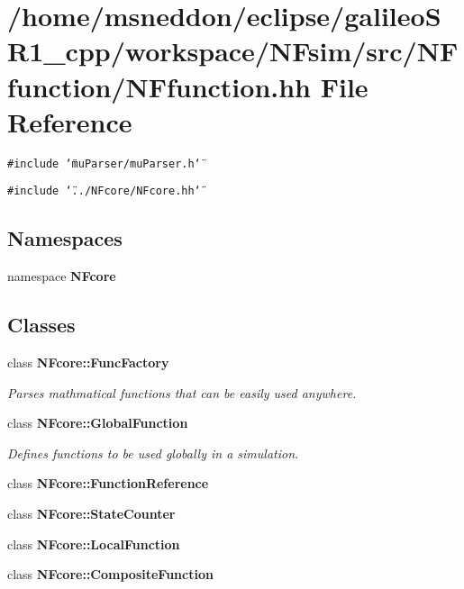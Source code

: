 \section{/home/msneddon/eclipse/galileoSR1\_\-cpp/workspace/NFsim/src/NFfunction/NFfunction.hh File Reference}
\label{NFfunction_8hh}


{\tt \#include \char`\"{}muParser/muParser.h\char`\"{}}\par
{\tt \#include \char`\"{}../NFcore/NFcore.hh\char`\"{}}\par
\subsection*{Namespaces}
\begin{CompactItemize}
\item 
namespace {\bf NFcore}
\end{CompactItemize}
\subsection*{Classes}
\begin{CompactItemize}
\item 
class {\bf NFcore::FuncFactory}
\begin{CompactList}\small\item\em Parses mathmatical functions that can be easily used anywhere. \item\end{CompactList}\item 
class {\bf NFcore::GlobalFunction}
\begin{CompactList}\small\item\em Defines functions to be used globally in a simulation. \item\end{CompactList}\item 
class {\bf NFcore::FunctionReference}
\item 
class {\bf NFcore::StateCounter}
\item 
class {\bf NFcore::LocalFunction}
\item 
class {\bf NFcore::CompositeFunction}
\end{CompactItemize}
